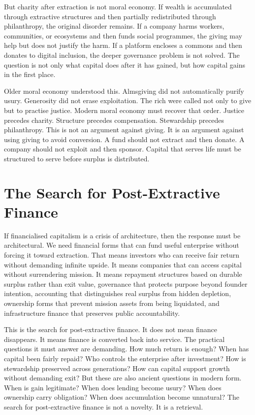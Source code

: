 \documentclass[11pt,a4paper,oneside]{book}
\begin{document}
But charity after extraction is not moral economy. If wealth is accumulated through extractive structures and then partially redistributed through philanthropy, the original disorder remains. If a company harms workers, communities, or ecosystems and then funds social programmes, the giving may help but does not justify the harm. If a platform encloses a commons and then donates to digital inclusion, the deeper governance problem is not solved. The question is not only what capital does after it has gained, but how capital gains in the first place.

Older moral economy understood this. Almsgiving did not automatically purify usury. Generosity did not erase exploitation. The rich were called not only to give but to practise justice. Modern moral economy must recover that order. Justice precedes charity. Structure precedes compensation. Stewardship precedes philanthropy. This is not an argument against giving. It is an argument against using giving to avoid conversion. A fund should not extract and then donate. A company should not exploit and then sponsor. Capital that serves life must be structured to serve before surplus is distributed.

\section*{The Search for Post-Extractive Finance}

If financialised capitalism is a crisis of architecture, then the response must be architectural. We need financial forms that can fund useful enterprise without forcing it toward extraction. That means investors who can receive fair return without demanding infinite upside. It means companies that can access capital without surrendering mission. It means repayment structures based on durable surplus rather than exit value, governance that protects purpose beyond founder intention, accounting that distinguishes real surplus from hidden depletion, ownership forms that prevent mission assets from being liquidated, and infrastructure finance that preserves public accountability.

This is the search for post-extractive finance. It does not mean finance disappears. It means finance is converted back into service. The practical questions it must answer are demanding. How much return is enough? When has capital been fairly repaid? Who controls the enterprise after investment? How is stewardship preserved across generations? How can capital support growth without demanding exit? But these are also ancient questions in modern form. When is gain legitimate? When does lending become usury? When does ownership carry obligation? When does accumulation become unnatural? The search for post-extractive finance is not a novelty. It is a retrieval.
\end{document}
